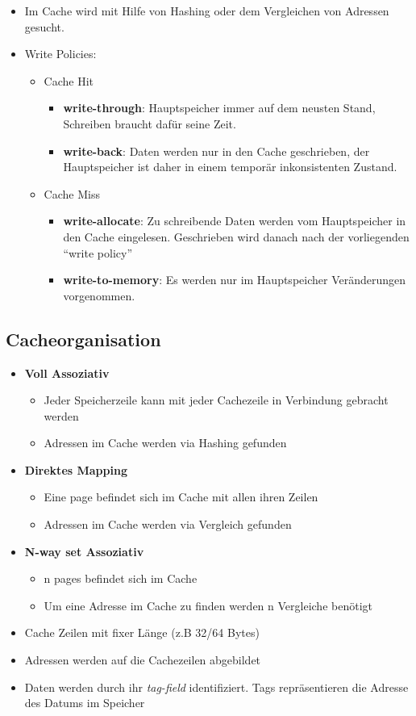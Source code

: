 \documentclass[a4paper]{scrreprt}
\begin{document}
\begin{itemize}
\item Im Cache wird mit Hilfe von Hashing oder dem Vergleichen von Adressen gesucht.
\item Write Policies:
\begin{itemize}
\item Cache Hit
\begin{itemize}
\item \textbf{write-through}: Hauptspeicher immer auf dem neusten Stand, Schreiben braucht dafür seine Zeit.
\item \textbf{write-back}: Daten werden nur in den Cache geschrieben, der Hauptspeicher ist daher in einem temporär inkonsistenten Zustand.
\end{itemize}
\item Cache Miss
\begin{itemize}
\item \textbf{write-allocate}: Zu schreibende Daten werden vom Hauptspeicher in den Cache eingelesen. Geschrieben wird danach nach der vorliegenden "`write policy"'
\item \textbf{write-to-memory}: Es werden nur im Hauptspeicher Veränderungen vorgenommen.
\end{itemize}
\end{itemize}
\end{itemize}

\subsection{Cacheorganisation}
\begin{itemize}
\item \textbf{Voll Assoziativ}
\begin{itemize}
\item Jeder Speicherzeile kann mit jeder Cachezeile in Verbindung gebracht werden
\item Adressen im Cache werden via Hashing gefunden
\end{itemize}
\item \textbf{Direktes Mapping}
\begin{itemize}
\item Eine page befindet sich im Cache mit allen ihren Zeilen
\item Adressen im Cache werden via Vergleich gefunden
\end{itemize}
\item \textbf{N-way set Assoziativ}
\begin{itemize}
\item n pages befindet sich im Cache
\item Um eine Adresse im Cache zu finden werden n Vergleiche benötigt
\end{itemize}
\item Cache Zeilen mit fixer Länge (z.B 32/64 Bytes)
\item Adressen werden auf die Cachezeilen abgebildet
\item Daten werden durch ihr \textit{tag-field} identifiziert. Tags repräsentieren die Adresse des Datums im Speicher
\end{itemize}
\end{document}
